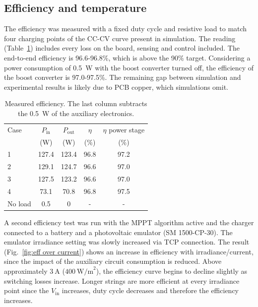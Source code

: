 \documentclass[conference]{IEEEtran}
\begin{document}
    \subsection{Efficiency and temperature}

    The efficiency was measured with a fixed duty cycle and resistive load to match four charging points of the CC-CV curve present in simulation. The reading (Table~\ref{tab:eff}) includes every loss on the board, sensing and control included. The end-to-end efficiency is 96.6-96.8\%, which is above the 90\% target. Considering a power consumption of 0.5~W with the boost converter turned off, the efficiency of the boost converter is 97.0-97.5\%. The remaining gap between simulation and experimental results is likely due to PCB copper, which simulations omit.

    \begin{table}[!t]
        \centering
        \caption{Measured efficiency. The last column subtracts the 0.5~W of the auxiliary electronics.}
        \label{tab:eff}
        \footnotesize
        \setlength{\tabcolsep}{2.6pt}
        \begin{tabular}{lcccc}
            \toprule
            Case & $P_{\mathrm{in}}$ & $P_{\mathrm{out}}$ & $\eta$ & $\eta$ power stage \\
            & (W) & (W) & (\%) & (\%) \\
            \midrule
            1 & 127.4 & 123.4 & 96.8 & 97.2 \\
            2 & 129.1 & 124.7 & 96.6 & 97.0 \\
            3 & 127.5 & 123.2 & 96.6 & 97.0 \\
            4 & 73.1 & 70.8 & 96.8 & 97.5 \\
            No load & 0.5 & 0 & - & - \\
            \bottomrule
        \end{tabular}
    \end{table}

    A second efficiency test was run with the MPPT algorithm active and the charger connected to a battery and a photovoltaic emulator (SM 1500-CP-30). The emulator irradiance setting was slowly increased via TCP connection. The result (Fig.~\ref{fig:eff over current}) shows an increase in efficiency with irradiance/current, since the impact of the auxiliary circuit consumption is reduced. Above approximately \(3~\mathrm{A}\) (\(400~\mathrm{W/m}^2\)), the efficiency curve begins to decline slightly as switching losses increase. Longer strings are more efficient at every irradiance point since the $V_{\mathrm{in}}$ increases, duty cycle decreases and therefore the efficiency increases. 
\end{document}
